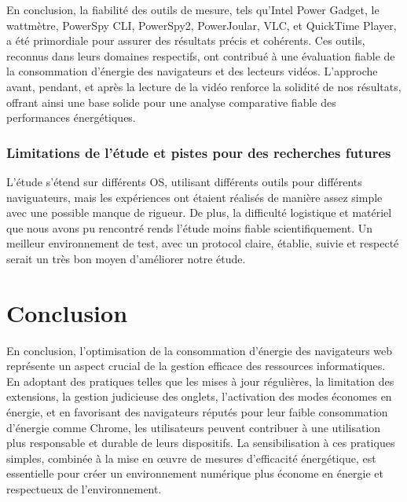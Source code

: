 \documentclass[12pt, a4paper]{report}
\begin{document}
En conclusion, la fiabilité des outils de mesure, tels qu'Intel Power Gadget, le wattmètre, PowerSpy CLI, PowerSpy2, PowerJoular, VLC, et QuickTime Player, a été primordiale pour assurer des résultats précis et cohérents. Ces outils, reconnus dans leurs domaines respectifs, ont contribué à une évaluation fiable de la consommation d'énergie des navigateurs et des lecteurs vidéos. L'approche avant, pendant, et après la lecture de la vidéo renforce la solidité de nos résultats, offrant ainsi une base solide pour une analyse comparative fiable des performances énergétiques.


\subsection{Limitations de l'étude et pistes pour des recherches futures}
L'étude s'étend sur différents OS, utilisant différents outils pour différents naviguateurs, mais les expériences ont étaient réalisés de manière assez simple avec une possible manque de rigueur. De plus, la difficulté logistique et matériel que nous avons pu rencontré rends l'étude moins fiable scientifiquement. 
Un meilleur environnement de test, avec un protocol claire, établie, suivie et respecté serait un très bon moyen d'améliorer notre étude. 

\chapter{\centering Conclusion}


En conclusion, l'optimisation de la consommation d'énergie des navigateurs web représente un aspect crucial de la gestion efficace des ressources informatiques. En adoptant des pratiques telles que les mises à jour régulières, la limitation des extensions, la gestion judicieuse des onglets, l'activation des modes économes en énergie, et en favorisant des navigateurs réputés pour leur faible consommation d'énergie comme Chrome, les utilisateurs peuvent contribuer à une utilisation plus responsable et durable de leurs dispositifs. La sensibilisation à ces pratiques simples, combinée à la mise en œuvre de mesures d'efficacité énergétique, est essentielle pour créer un environnement numérique plus économe en énergie et respectueux de l'environnement.
\end{document}
